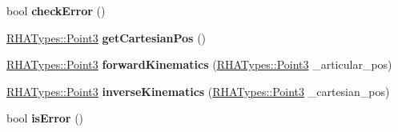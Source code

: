 \begin{DoxyCompactItemize}
\item 
bool {\bfseries check\+Error} ()\hypertarget{classRobotRHA_af0895334b7ec3a7f9d34c9b7d79dee3d}{}\label{classRobotRHA_af0895334b7ec3a7f9d34c9b7d79dee3d}

\item 
\hyperlink{structRHATypes_1_1Point3}{R\+H\+A\+Types\+::\+Point3} {\bfseries get\+Cartesian\+Pos} ()\hypertarget{classRobotRHA_af5f5e6f159e20e1578d8d0e52ff3e3fc}{}\label{classRobotRHA_af5f5e6f159e20e1578d8d0e52ff3e3fc}

\item 
\hyperlink{structRHATypes_1_1Point3}{R\+H\+A\+Types\+::\+Point3} {\bfseries forward\+Kinematics} (\hyperlink{structRHATypes_1_1Point3}{R\+H\+A\+Types\+::\+Point3} \+\_\+articular\+\_\+pos)\hypertarget{classRobotRHA_a605a8a760bcbcbb40531e17ac250bbb2}{}\label{classRobotRHA_a605a8a760bcbcbb40531e17ac250bbb2}

\item 
\hyperlink{structRHATypes_1_1Point3}{R\+H\+A\+Types\+::\+Point3} {\bfseries inverse\+Kinematics} (\hyperlink{structRHATypes_1_1Point3}{R\+H\+A\+Types\+::\+Point3} \+\_\+cartesian\+\_\+pos)\hypertarget{classRobotRHA_a682cf6fa12caf83f1180ba69875f1dea}{}\label{classRobotRHA_a682cf6fa12caf83f1180ba69875f1dea}

\item 
bool {\bfseries is\+Error} ()\hypertarget{classRobotRHA_a8e6bb9ca49218ffddaf677b1ed52cffa}{}\label{classRobotRHA_a8e6bb9ca49218ffddaf677b1ed52cffa}

\end{DoxyCompactItemize}
